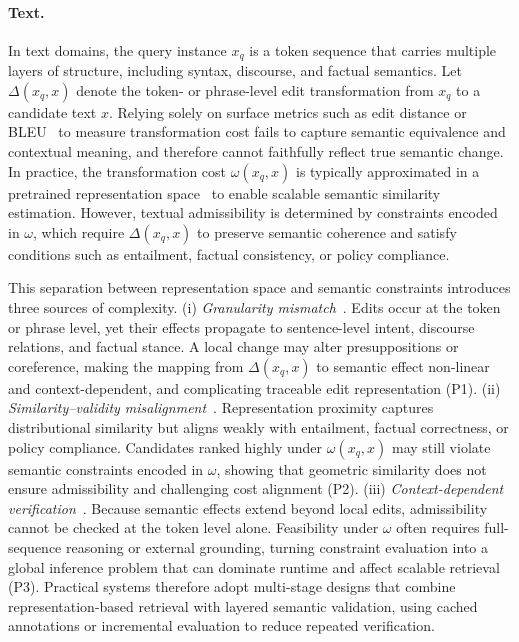 \paragraph{Text.}
In text domains, the query instance $x_q$ is a token sequence that carries multiple layers of structure, including syntax, discourse, and factual semantics. Let $\Delta(x_q,x)$ denote the token- or phrase-level edit transformation from $x_q$ to a candidate text $x$. Relying solely on surface metrics such as edit distance or BLEU~\cite{papineni2002bleu} to measure transformation cost fails to capture semantic equivalence and contextual meaning, and therefore cannot faithfully reflect true semantic change. In practice, the transformation cost $\omega(x_q,x)$ is typically approximated in a pretrained representation space~\cite{devlin2019bert} to enable scalable semantic similarity estimation. However, textual admissibility is determined by constraints encoded in $\omega$, which require $\Delta(x_q,x)$ to preserve semantic coherence and satisfy conditions such as entailment, factual consistency, or policy compliance.

This separation between representation space and semantic constraints introduces three sources of complexity. (i) \emph{Granularity mismatch}~\cite{yin2015multigrancnn}. Edits occur at the token or phrase level, yet their effects propagate to sentence-level intent, discourse relations, and factual stance. A local change may alter presuppositions or coreference, making the mapping from $\Delta(x_q,x)$ to semantic effect non-linear and context-dependent, and complicating traceable edit representation (P1). (ii) \emph{Similarity–validity misalignment}~\cite{wang2021robustness}. Representation proximity captures distributional similarity but aligns weakly with entailment, factual correctness, or policy compliance. Candidates ranked highly under $\omega(x_q,x)$ may still violate semantic constraints encoded in $\omega$, showing that geometric similarity does not ensure admissibility and challenging cost alignment (P2). (iii) \emph{Context-dependent verification}~\cite{gu2024survey}. Because semantic effects extend beyond local edits, admissibility cannot be checked at the token level alone. Feasibility under $\omega$ often requires full-sequence reasoning or external grounding, turning constraint evaluation into a global inference problem that can dominate runtime and affect scalable retrieval (P3). Practical systems therefore adopt multi-stage designs that combine representation-based retrieval with layered semantic validation, using cached annotations or incremental evaluation to reduce repeated verification.

